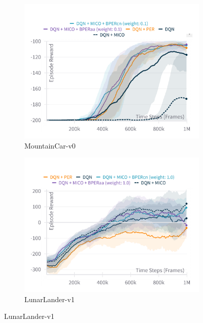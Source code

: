 \begin{figure}[h]
    \centering
    \begin{subfigure}{0.45\textwidth}
    \includegraphics[width=\linewidth]{Results/general_results/episode_reward_mountaincarv0.png}
        \caption{MountainCar-v0}
        \label{fig:episode_reward_mountaincarv0}
    \end{subfigure}
    \hfill
    \begin{subfigure}{0.45\textwidth}
        \includegraphics[width=\linewidth]{Results/general_results/episode_reward_lunarlander.png}
        \caption{LunarLander-v1}
        \label{fig:episode_reward_lunarlander}
    \end{subfigure}

\end{figure}

